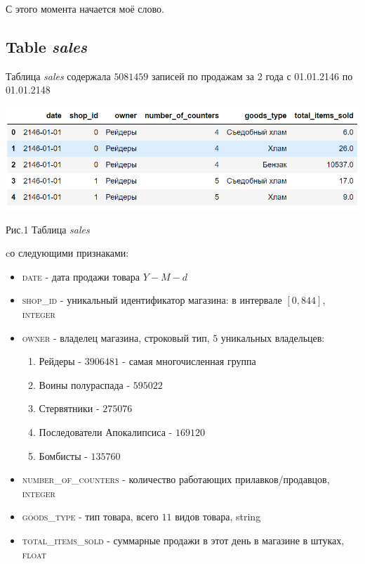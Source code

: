 \documentclass[%
10pt, %
final, %
oneside, %
onecolumn, %
centertags]{article} %
\theoremstyle{plain}
\theoremstyle{definition}
\theoremstyle{remark}
\begin{document}
С этого момента начается моё слово.

\subsection{Table \textit{sales}}

Таблица \textit{sales} содержала $5081459$ записей по продажам за $2$ года с \textsc{01.01.2146} по  \textsc{01.01.2148}

\begin{center}
	\includegraphics[scale=0.35]{1.png}

 	Рис.1 Таблица \textit{sales}
\end{center}

cо следующими признаками:
\begin{itemize}
	\item \textsc{date} - дата продажи товара $Y-M-d$	
	\item \textsc{shop\_id} - уникальный идентификатор магазина: в интервале $[0, 844]$, \textsc{integer}
	\item \textsc{owner} - владелец магазина, строковый тип, $5$ уникальных владельцев: 
	\begin{enumerate}
		\item Рейдеры - $3906481$ - самая многочисленная группа
		\item Воины полураспада - $595022$
		\item Стервятники - $275076$
		\item Последователи Апокалипсиса - $169120$
		\item Бомбисты - $135760$
	\end{enumerate}
	\item \textsc{number\_of\_counters} - количество работающих прилавков/продавцов, \textsc{integer}
	\item \textsc{goods\_type} - тип товара, всего $11$ видов товара, string
	\item \textsc{total\_items\_sold} - суммарные продажи в этот день в магазине в штуках, \textsc{float}
\end{itemize}
\end{document}
